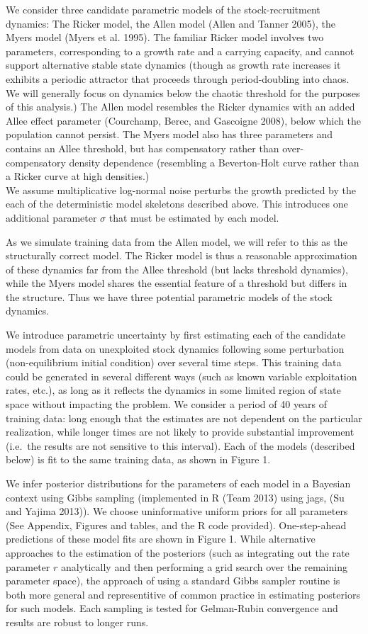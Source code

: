 \documentclass[author-year, review]{elsarticle} %
\begin{document}
We consider three candidate parametric models of the stock-recruitment
dynamics: The Ricker model, the Allen model (Allen and Tanner 2005), the
Myers model (Myers et al. 1995). The familiar Ricker model involves two
parameters, corresponding to a growth rate and a carrying capacity, and
cannot support alternative stable state dynamics (though as growth rate
increases it exhibits a periodic attractor that proceeds through
period-doubling into chaos. We will generally focus on dynamics below
the chaotic threshold for the purposes of this analysis.) The Allen
model resembles the Ricker dynamics with an added Allee effect parameter
(Courchamp, Berec, and Gascoigne 2008), below which the population
cannot persist. The Myers model also has three parameters and contains
an Allee threshold, but has compensatory rather than over-compensatory
density dependence (resembling a Beverton-Holt curve rather than a
Ricker curve at high densities.)\\We assume multiplicative log-normal
noise perturbs the growth predicted by the each of the deterministic
model skeletons described above. This introduces one additional
parameter $\sigma$ that must be estimated by each model.

As we simulate training data from the Allen model, we will refer to this
as the structurally correct model. The Ricker model is thus a reasonable
approximation of these dynamics far from the Allee threshold (but lacks
threshold dynamics), while the Myers model shares the essential feature
of a threshold but differs in the structure. Thus we have three
potential parametric models of the stock dynamics.

We introduce parametric uncertainty by first estimating each of the
candidate models from data on unexploited stock dynamics following some
perturbation (non-equilibrium initial condition) over several time
steps. This training data could be generated in several different ways
(such as known variable exploitation rates, etc.), as long as it
reflects the dynamics in some limited region of state space without
impacting the problem. We consider a period of 40 years of training
data: long enough that the estimates are not dependent on the particular
realization, while longer times are not likely to provide substantial
improvement (i.e.~the results are not sensitive to this interval). Each
of the models (described below) is fit to the same training data, as
shown in Figure 1.

We infer posterior distributions for the parameters of each model in a
Bayesian context using Gibbs sampling (implemented in R (Team 2013)
using jags, (Su and Yajima 2013)). We choose uninformative uniform
priors for all parameters (See Appendix, Figures and tables, and the R
code provided). One-step-ahead predictions of these model fits are shown
in Figure 1. While alternative approaches to the estimation of the
posteriors (such as integrating out the rate parameter $r$ analytically
and then performing a grid search over the remaining parameter space),
the approach of using a standard Gibbs sampler routine is both more
general and representitive of common practice in estimating posteriors
for such models. Each sampling is tested for Gelman-Rubin convergence
and results are robust to longer runs.
\end{document}
